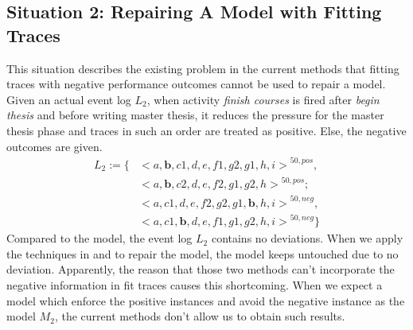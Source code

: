\subsection{Situation 2: \small{Repairing A Model with Fitting Traces}}
This situation describes the existing problem in the current methods that fitting traces with negative performance outcomes cannot be used to repair a model. Given an actual event log $L_2$, when activity \emph{finish courses} is fired after \emph{begin thesis} and before writing master thesis, it reduces the pressure for the master thesis phase and traces in such an order are treated as positive. Else, the negative outcomes are given. 
\begin{align*}
L_2:=\{ & { <a,\textbf{b},c1,d,e,f1,g2,g1,h,i>}^{50, pos} , \\   &{<a,\textbf{b},c2,d,e,f2,g1,g2,h>}^{50, pos};   \\
& {<a,c1,d,e,f2,g2,g1,\textbf{b},h,i>}^{50, neg} , \\
& {<a,c1,\textbf{b},d,e,f1,g1,g2,h,i>}^{50, neg}  \}
\end{align*}
Compared to the model, the event log $L_2$ contains no deviations. When we apply the techniques in \cite{fahland2015model} and \cite{dees2017enhancing} to repair the model, the model keeps untouched due to no deviation. Apparently, the reason that those two methods can't incorporate the negative information in fit traces causes this shortcoming. When we expect a model which enforce the positive instances and avoid the negative instance as the model $M_2$, the current methods don't allow us to obtain such results. 
